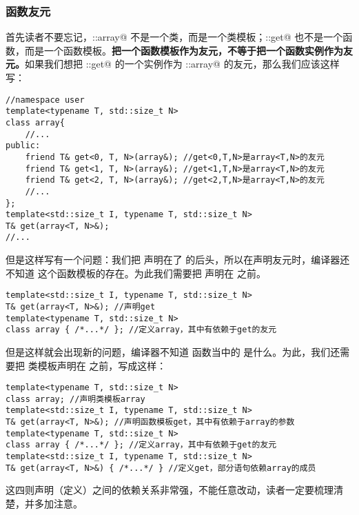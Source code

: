 \subsubsection*{函数友元}
首先读者不要忘记，\lstinline@user::array@ 不是一个类，而是一个类模板；\lstinline@user::get@ 也不是一个函数，而是一个函数模板。\textbf{把一个函数模板作为友元，不等于把一个函数实例作为友元。}如果我们想把 \lstinline@user::get@ 的一个实例作为 \lstinline@user::array@ 的友元，那么我们应该这样写：
\begin{lstlisting}
//namespace user
template<typename T, std::size_t N>
class array{
    //...
public:
    friend T& get<0, T, N>(array&); //get<0,T,N>是array<T,N>的友元
    friend T& get<1, T, N>(array&); //get<1,T,N>是array<T,N>的友元
    friend T& get<2, T, N>(array&); //get<2,T,N>是array<T,N>的友元
    //...
};
template<std::size_t I, typename T, std::size_t N>
T& get(array<T, N>&);
//...
\end{lstlisting}
但是这样写有一个问题：我们把 \lstinline@get@ 声明在了 \lstinline@array@ 的后头，所以在声明友元时，编译器还不知道 \lstinline@get@ 这个函数模板的存在。为此我们需要把 \lstinline@get@ 声明在 \lstinline@array@ 之前。
\begin{lstlisting}
template<std::size_t I, typename T, std::size_t N>
T& get(array<T, N>&); //声明get
template<typename T, std::size_t N>
class array { /*...*/ }; //定义array，其中有依赖于get的友元
\end{lstlisting}
但是这样就会出现新的问题，编译器不知道 \lstinline@get@ 函数当中的 \lstinline@array@ 是什么。为此，我们还需要把 \lstinline@array@ 类模板声明在 \lstinline@get@ 之前，写成这样：
\begin{lstlisting}
template<typename T, std::size_t N>
class array; //声明类模板array
template<std::size_t I, typename T, std::size_t N>
T& get(array<T, N>&); //声明函数模板get，其中有依赖于array的参数
template<typename T, std::size_t N>
class array { /*...*/ }; //定义array，其中有依赖于get的友元
template<std::size_t I, typename T, std::size_t N>
T& get(array<T, N>&) { /*...*/ } //定义get，部分语句依赖array的成员
\end{lstlisting}
这四则声明（定义）之间的依赖关系非常强，不能任意改动，读者一定要梳理清楚，并多加注意。\par
